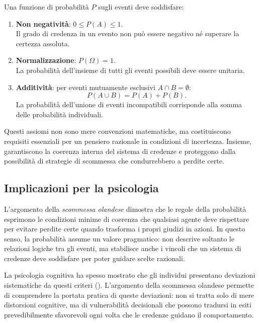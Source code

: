 \documentclass[
  letterpaper,
  DIV=11,
  numbers=noendperiod,
  oneside]{scrreprt}
\theoremstyle{definition}
\theoremstyle{plain}
\theoremstyle{definition}
\theoremstyle{remark}
\begin{document}
Una funzione di probabilità \(P\) sugli eventi deve soddisfare:

\begin{enumerate}
\def\labelenumi{\arabic{enumi}.}
\item
  \textbf{Non negatività}: \(0 \leq P(A) \leq 1\).\\
  Il grado di credenza in un evento non può essere negativo né superare
  la certezza assoluta.
\item
  \textbf{Normalizzazione}: \(P(\Omega) = 1\).\\
  La probabilità dell'insieme di tutti gli eventi possibili deve essere
  unitaria.
\item
  \textbf{Additività}: per eventi mutuamente esclusivi
  \(A \cap B = \emptyset\): \[P(A \cup B) = P(A) + P(B).\] La
  probabilità dell'unione di eventi incompatibili corrisponde alla somma
  delle probabilità individuali.
\end{enumerate}

Questi assiomi non sono mere convenzioni matematiche, ma costituiscono
requisiti essenziali per un pensiero razionale in condizioni di
incertezza. Insieme, garantiscono la coerenza interna del sistema di
credenze e proteggono dalla possibilità di strategie di scommessa che
condurrebbero a perdite certe.

\subsection{Implicazioni per la
psicologia}\label{implicazioni-per-la-psicologia}

L'argomento della \emph{scommessa olandese} dimostra che le regole della
probabilità esprimono le condizioni minime di coerenza che qualsiasi
agente deve rispettare per evitare perdite certe quando trasforma i
propri giudizi in azioni. In questo senso, la probabilità assume un
valore pragmatico: non descrive soltanto le relazioni logiche tra gli
eventi, ma stabilisce anche i vincoli che un sistema di credenze deve
soddisfare per poter guidare scelte razionali.

La psicologia cognitiva ha spesso mostrato che gli individui presentano
deviazioni sistematiche da questi criteri
().
L'argomento della scommessa olandese permette di comprendere la portata
pratica di queste deviazioni: non si tratta solo di mere distorsioni
cognitive, ma di vulnerabilità decisionali che possono tradursi in esiti
prevedibilmente sfavorevoli ogni volta che le credenze guidano il
comportamento.
\end{document}
